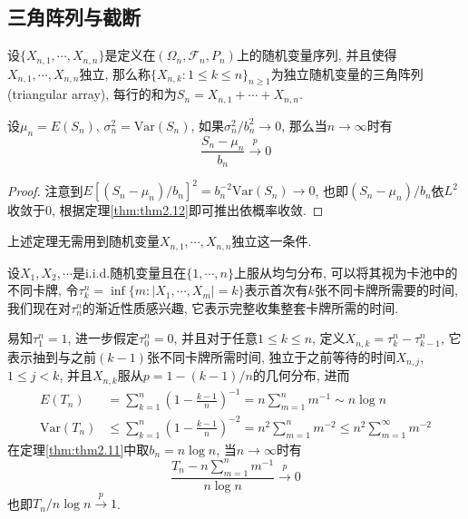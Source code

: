 \documentclass[cn, 12pt, math=mtpro2, bibstyle=apa, blue, twocol]{elegantbook}
\newcommand{\F}{\mathcal{F}}
\begin{document}
\subsection{三角阵列与截断}
\begin{definition}
设$\{X_{n,1},\cdots,X_{n,n}\}$是定义在$(\Omega_n,\F_n,P_n)$上的随机变量序列, 并且使得$X_{n,1},\cdots,X_{n,n}$独立, 那么称$\{X_{n,k}:1\leq k\leq n\}_{n\ge1}$为独立随机变量的三角阵列(triangular array), 每行的和为$S_n=X_{n,1}+\cdots+X_{n,n}$.
\end{definition}
\begin{theorem}\label{thm:thm2.11}
  设$\mu_n=E(S_n)$, $\sigma_n^2=\text{Var}(S_n)$, 如果$\sigma_n^2/b_n^2\to0$, 那么当$n\to\infty$时有
  $$\frac{S_n-\mu_n}{b_n}\xrightarrow{p}0$$
\end{theorem}
\begin{proof}
  注意到$E[(S_n-\mu_n)/b_n]^2=b_n^{-2}\text{Var}(S_n)\to0$, 也即$(S_n-\mu_n)/b_n$依$L^2$收敛于0, 根据定理\ref{thm:thm2.12}即可推出依概率收敛.
\end{proof}
\begin{remark}
上述定理无需用到随机变量$X_{n,1},\cdots,X_{n,n}$独立这一条件.
\end{remark}

\begin{example}[卡牌收集问题]
设$X_1,X_2,\cdots$是i.i.d.随机变量且在$\{1,\cdots,n\}$上服从均匀分布, 可以将其视为卡池中的不同卡牌, 令$\tau_k^n=\inf\{m: |X_1,\cdots,X_m|=k\}$表示首次有$k$张不同卡牌所需要的时间, 我们现在对$\tau_n^n$的渐近性质感兴趣, 它表示完整收集整套卡牌所需的时间.

易知$\tau_1^n=1$, 进一步假定$\tau_0^n=0$, 并且对于任意$1\leq k\leq n$, 定义$X_{n,k}=\tau_k^n-\tau_{k-1}^n$, 它表示抽到与之前$(k-1)$张不同卡牌所需时间, 独立于之前等待的时间$X_{n,j}$, $1\leq j<k$, 并且$X_{n,k}$服从$p=1-(k-1)/n$的几何分布, 进而
\begin{align*}
E(T_n)&=\sum_{k=1}^{n}\left(1-\frac{k-1}{n}\right)^{-1}=n\sum_{m=1}^{n}m^{-1}\sim n\log n \\
\text{Var}(T_n)&\leq \sum_{k=1}^{n}\left(1-\frac{k-1}{n}\right)^{-2}=n^2\sum_{m=1}^{n}m^{-2}\leq n^2\sum_{m=1}^{\infty}m^{-2}
\end{align*}
在定理\ref{thm:thm2.11}中取$b_n=n\log n$, 当$n\to\infty$时有
$$\frac{T_n-n\sum_{m=1}^{n}m^{-1}}{n\log n}\xrightarrow{p}0$$
也即$T_n/n\log n\xrightarrow{p}1$.
\end{example}
\end{document}
